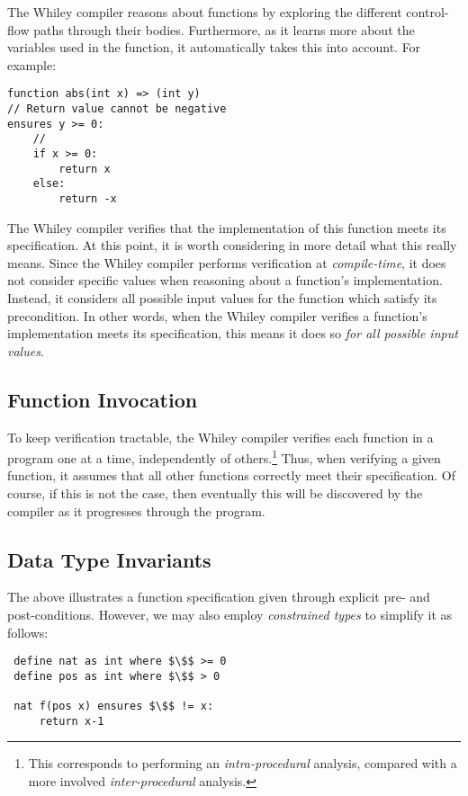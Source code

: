 The Whiley compiler reasons about functions by exploring the different
control-flow paths through their bodies.  Furthermore, as it learns
more about the variables used in the function, it automatically takes
this into account.  For example:
\begin{lstlisting}
function abs(int x) => (int y)
// Return value cannot be negative
ensures y >= 0:
    //
    if x >= 0:
        return x
    else:
        return -x
\end{lstlisting}
The Whiley compiler verifies that the implementation of this function
meets its specification.  At this point, it is worth considering in
more detail what this really means.  Since the Whiley compiler
performs verification at {\em compile-time}, it does not consider
specific values when reasoning about a function's implementation.
Instead, it considers all possible input values for the function which
satisfy its precondition.  In other words, when the Whiley compiler
verifies a function's implementation meets its specification, this
means it does so {\em for all possible input values}.  

\subsection{Function Invocation}

To keep verification tractable, the Whiley compiler verifies each
function in a program one at a time, independently of
others.\footnote{This corresponds to performing an {\em
    intra-procedural} analysis, compared with a more involved {\em
    inter-procedural} analysis.}  Thus, when verifying a given
function, it assumes that all other functions correctly meet their
specification.  Of course, if this is not the case, then eventually
this will be discovered by the compiler as it progresses through the
program.

\subsection{Data Type Invariants}

The above illustrates a function specification given through explicit pre- and
post-conditions.  However, we may also employ {\em constrained types}
to simplify it as follows:

\begin{lstlisting}
 define nat as int where $\$$ >= 0
 define pos as int where $\$$ > 0

 nat f(pos x) ensures $\$$ != x:
     return x-1
\end{lstlisting}

